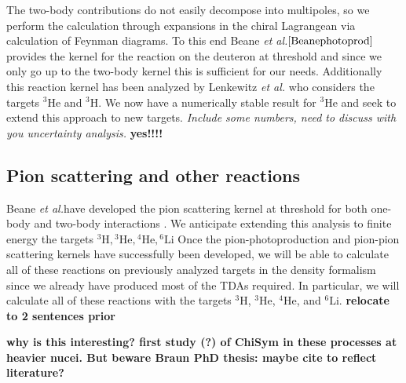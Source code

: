 \documentclass[a4paper,11pt]{article}
\newcommand{\etal}{\textit{et al.}}
\newcommand{\LiS}{{}^{6} \mathrm{Li} }
\newcommand{\HeF}{{}^{4} \mathrm{He}}
\newcommand{\HeT}{{}^{3} \mathrm{He}}
\newcommand{\HThree}{{}^{3} \mathrm{H}}
\newcommand{\ques}[1]{\color{red}\textit{ #1 }\color{black}}
\newcommand{\com}[1]{\color{blue}\small\textbf{ #1 }\color{black}\normalsize}
\begin{document}
The two-body contributions do not easily decompose into multipoles, so we perform the calculation through expansions
in the chiral Lagrangean via calculation of Feynman diagrams.
To this end Beane \etal $\cite{Beanephotoprod}$ provides the kernel for the reaction on the deuteron at threshold
and since we only go up to the two-body kernel this is sufficient for our needs.
Additionally this reaction kernel has been analyzed by
Lenkewitz \etal \cite{L2011, L2013} who considers the targets $\HeT$ and $\HThree$.
We now have a numerically stable result for $\HeT$ and seek to extend
this approach to new targets.
\ques{Include some numbers, need to discuss with you uncertainty analysis.} \com{yes!!!!}


\subsection{Pion scattering and other reactions}
Beane \etal have developed the pion scattering kernel at threshold for both
one-body and two-body interactions \cite{Beane2003}.
We anticipate extending this analysis to finite energy the targets $\HThree, \HeT, \HeF, \LiS$
Once the pion-photoproduction and pion-pion scattering kernels have
successfully been developed, we will be able to calculate all of
these reactions on previously analyzed targets in the density
formalism since we already have produced most of the TDAs required.
In particular, we will calculate all of these reactions with the
targets $\HThree$, $\HeT$, $\HeF$, and $\LiS$. \com{relocate to 2 sentences prior}

\com{why is this interesting? first study (?) of ChiSym in these processes at heavier nucei. But beware Braun PhD thesis: maybe cite to reflect literature?}

\end{document}
